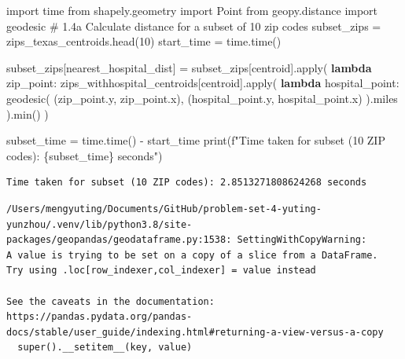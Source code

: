 \documentclass[
  letterpaper,
  DIV=11,
  numbers=noendperiod]{scrartcl}
\newenvironment{Shaded}{\begin{snugshade}}{\end{snugshade}}
\newcommand{\BuiltInTok}[1]{\textcolor[rgb]{0.00,0.23,0.31}{#1}}
\newcommand{\CommentTok}[1]{\textcolor[rgb]{0.37,0.37,0.37}{#1}}
\newcommand{\DecValTok}[1]{\textcolor[rgb]{0.68,0.00,0.00}{#1}}
\newcommand{\ImportTok}[1]{\textcolor[rgb]{0.00,0.46,0.62}{#1}}
\newcommand{\KeywordTok}[1]{\textcolor[rgb]{0.00,0.23,0.31}{\textbf{#1}}}
\newcommand{\NormalTok}[1]{\textcolor[rgb]{0.00,0.23,0.31}{#1}}
\newcommand{\OperatorTok}[1]{\textcolor[rgb]{0.37,0.37,0.37}{#1}}
\newcommand{\SpecialCharTok}[1]{\textcolor[rgb]{0.37,0.37,0.37}{#1}}
\newcommand{\SpecialStringTok}[1]{\textcolor[rgb]{0.13,0.47,0.30}{#1}}
\newcommand{\StringTok}[1]{\textcolor[rgb]{0.13,0.47,0.30}{#1}}
\begin{document}
\begin{Shaded}
\begin{Highlighting}[]
\ImportTok{import}\NormalTok{ time}
\ImportTok{from}\NormalTok{ shapely.geometry }\ImportTok{import}\NormalTok{ Point}
\ImportTok{from}\NormalTok{ geopy.distance }\ImportTok{import}\NormalTok{ geodesic}
\CommentTok{\# 1.4a Calculate distance for a subset of 10 zip codes}
\NormalTok{subset\_zips }\OperatorTok{=}\NormalTok{ zips\_texas\_centroids.head(}\DecValTok{10}\NormalTok{)}
\NormalTok{start\_time }\OperatorTok{=}\NormalTok{ time.time()}

\NormalTok{subset\_zips[}\StringTok{\textquotesingle{}nearest\_hospital\_dist\textquotesingle{}}\NormalTok{] }\OperatorTok{=}\NormalTok{ subset\_zips[}\StringTok{\textquotesingle{}centroid\textquotesingle{}}\NormalTok{].}\BuiltInTok{apply}\NormalTok{(}
    \KeywordTok{lambda}\NormalTok{ zip\_point: zips\_withhospital\_centroids[}\StringTok{\textquotesingle{}centroid\textquotesingle{}}\NormalTok{].}\BuiltInTok{apply}\NormalTok{(}
        \KeywordTok{lambda}\NormalTok{ hospital\_point: geodesic(}
\NormalTok{            (zip\_point.y, zip\_point.x), }
\NormalTok{            (hospital\_point.y, hospital\_point.x)}
\NormalTok{        ).miles}
\NormalTok{    ).}\BuiltInTok{min}\NormalTok{()}
\NormalTok{)}

\NormalTok{subset\_time }\OperatorTok{=}\NormalTok{ time.time() }\OperatorTok{{-}}\NormalTok{ start\_time}
\BuiltInTok{print}\NormalTok{(}\SpecialStringTok{f"Time taken for subset (10 ZIP codes): }\SpecialCharTok{\{}\NormalTok{subset\_time}\SpecialCharTok{\}}\SpecialStringTok{ seconds"}\NormalTok{)}
\end{Highlighting}
\end{Shaded}

\begin{verbatim}
Time taken for subset (10 ZIP codes): 2.8513271808624268 seconds
\end{verbatim}

\begin{verbatim}
/Users/mengyuting/Documents/GitHub/problem-set-4-yuting-yunzhou/.venv/lib/python3.8/site-packages/geopandas/geodataframe.py:1538: SettingWithCopyWarning: 
A value is trying to be set on a copy of a slice from a DataFrame.
Try using .loc[row_indexer,col_indexer] = value instead

See the caveats in the documentation: https://pandas.pydata.org/pandas-docs/stable/user_guide/indexing.html#returning-a-view-versus-a-copy
  super().__setitem__(key, value)
\end{verbatim}
\end{document}
